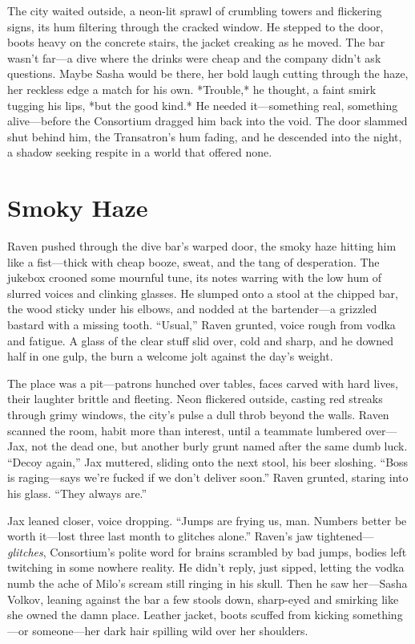 \documentclass[12pt]{book}
\begin{document}
The city waited outside, a neon-lit sprawl of crumbling towers and flickering signs, its hum filtering through the cracked window. He stepped to the door, boots heavy on the concrete stairs, the jacket creaking as he moved. The bar wasn’t far—a dive where the drinks were cheap and the company didn’t ask questions. Maybe Sasha would be there, her bold laugh cutting through the haze, her reckless edge a match for his own. *Trouble,* he thought, a faint smirk tugging his lips, *but the good kind.* He needed it—something real, something alive—before the Consortium dragged him back into the void. The door slammed shut behind him, the Transatron’s hum fading, and he descended into the night, a shadow seeking respite in a world that offered none.

\section{Smoky Haze}

Raven pushed through the dive bar’s warped door, the smoky haze hitting him like a fist—thick with cheap booze, sweat, and the tang of desperation. The jukebox crooned some mournful tune, its notes warring with the low hum of slurred voices and clinking glasses. He slumped onto a stool at the chipped bar, the wood sticky under his elbows, and nodded at the bartender—a grizzled bastard with a missing tooth. “Usual,” Raven grunted, voice rough from vodka and fatigue. A glass of the clear stuff slid over, cold and sharp, and he downed half in one gulp, the burn a welcome jolt against the day’s weight.

The place was a pit—patrons hunched over tables, faces carved with hard lives, their laughter brittle and fleeting. Neon flickered outside, casting red streaks through grimy windows, the city’s pulse a dull throb beyond the walls. Raven scanned the room, habit more than interest, until a teammate lumbered over—Jax, not the dead one, but another burly grunt named after the same dumb luck. “Decoy again,” Jax muttered, sliding onto the next stool, his beer sloshing. “Boss is raging—says we’re fucked if we don’t deliver soon.” Raven grunted, staring into his glass. “They always are.”

Jax leaned closer, voice dropping. “Jumps are frying us, man. Numbers better be worth it—lost three last month to glitches alone.” Raven’s jaw tightened—\textit{glitches}, Consortium’s polite word for brains scrambled by bad jumps, bodies left twitching in some nowhere reality. He didn’t reply, just sipped, letting the vodka numb the ache of Milo’s scream still ringing in his skull. Then he saw her—Sasha Volkov, leaning against the bar a few stools down, sharp-eyed and smirking like she owned the damn place. Leather jacket, boots scuffed from kicking something—or someone—her dark hair spilling wild over her shoulders.
\end{document}
